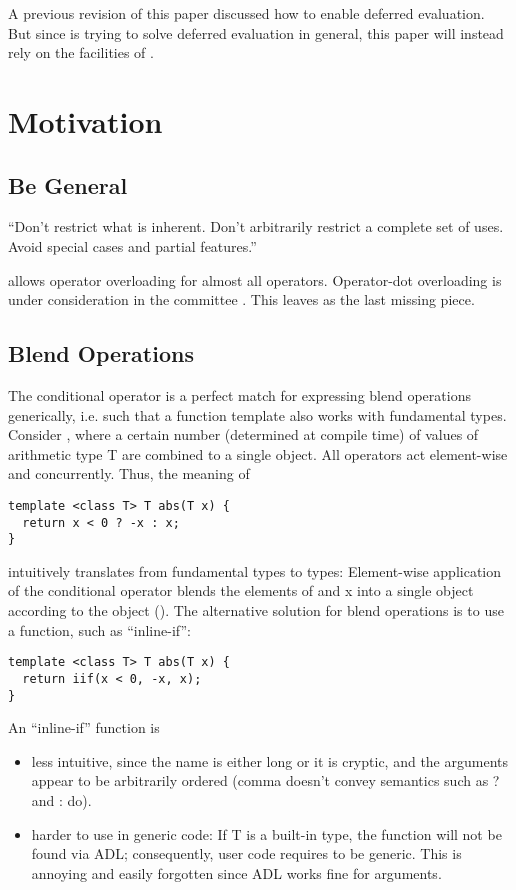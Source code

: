 A previous revision of this paper discussed how to enable deferred evaluation.
But since \textcite{P0927R2} is trying to solve deferred evaluation in general, this paper will instead rely on the facilities of \cite{P0927R2}.

\section{Motivation}
\subsection{Be General}
“Don’t restrict what is inherent.
Don’t arbitrarily restrict a complete set of uses.
Avoid special cases and partial features.” \cite{P0745R0}

\CC{} allows operator overloading for almost all operators.
Operator-dot overloading is under consideration in the committee \cite{P0352R1,P0416R1}.
This leaves  as the last missing piece.

\subsection{Blend Operations}
The conditional operator is a perfect match for expressing blend operations generically, i.e. such that a function template also works with fundamental types.
Consider  \cite[§9]{N4808}, where a certain number (determined at compile time) of values of arithmetic type \type T are combined to a single object.
All operators act element-wise and concurrently.
Thus, the meaning of
\smallskip\begin{lstlisting}[style=Vc]
template <class T> T abs(T x) {
  return x < 0 ? -x : x;
}
\end{lstlisting}
intuitively translates from fundamental types to  types:
Element-wise application of the conditional operator blends the elements of  and \code x into a single  object according to the  object ().
The alternative solution for  blend operations is to use a function, such as “inline-if”:
\smallskip\begin{lstlisting}[style=Vc]
template <class T> T abs(T x) {
  return iif(x < 0, -x, x);
}
\end{lstlisting}
An “inline-if” function is
\begin{itemize}
  \item less intuitive, since the name is either long or it is cryptic, and the arguments appear to be arbitrarily ordered (comma doesn't convey semantics such as \code ? and \code : do).
  \item harder to use in generic code:
    If \type T is a built-in type, the  function will not be found via ADL; consequently, user code requires  to be generic.
    This is annoying and easily forgotten since ADL works fine for  arguments.
\end{itemize}

